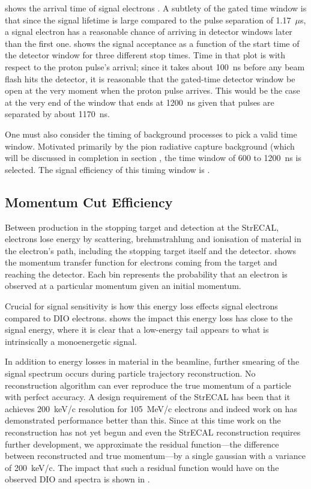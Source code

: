  shows the arrival time of signal electrons .
A subtlety of the gated time window is that since the signal lifetime is large compared to the pulse separation of 1.17~$\mu$s, a signal electron has a reasonable chance of arriving in detector windows later than the first one.
 shows the signal acceptance as a function of the start time of the detector window for three different stop times.
Time in that plot is with respect to the proton pulse's arrival; since it takes about 100~ns before any beam flash hits the detector, it is reasonable that the gated-time detector window be open at the very moment when the proton pulse arrives.
This would be the case at the very end of the window that ends at 1200~ns given that pulses are separated by about 1170~ns.

One must also consider the timing of background processes to pick a valid time window.
Motivated primarily by the pion radiative capture background (which will be discussed in completion in section , the time window of 600 to 1200~ns is selected.
The signal efficiency of this timing window is \VarAcceptanceTime.

\FigSensMomTransfer
\subsection{Momentum Cut Efficiency}
Between production in the stopping target and detection at the StrECAL, electrons lose energy by scattering, brehmstrahlung and ionisation of material in the electron's path, including the stopping target itself and the detector.
 shows the momentum transfer function for electrons coming from the target and reaching the detector.
Each bin represents the probability that an electron is observed at a particular momentum given an initial momentum.
\FigSensMomSpectra

Crucial for signal sensitivity is how this energy loss effects signal electrons compared to \ac{DIO} electrons.
 shows the impact this energy loss has close to the signal energy, where it is clear that a low-energy tail appears to what is intrinsically a monoenergetic signal.

In addition to energy losses in material in the beamline, further smearing of the signal spectrum occurs during particle trajectory reconstruction.
No reconstruction algorithm can ever reproduce the true momentum of a particle with perfect accuracy.
A design requirement of the StrECAL has been that it achieves 200~keV/c resolution for 105~MeV/c electrons and indeed work on \phaseI has demonstrated performance better than this.
Since at this time work on the \phaseII reconstruction has not yet begun and even the \phaseI StrECAL reconstruction requires further development, we approximate the residual function---the difference between reconstructed and true momentum---by a single gaussian with a variance of 200~keV/c.
The impact that such a residual function would have on the observed DIO and \mueconv spectra is shown in .

